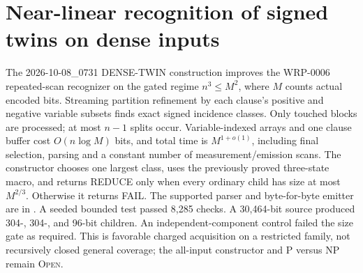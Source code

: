 \section{Near-linear recognition of signed twins on dense inputs}
The 2026-10-08\_0731 DENSE-TWIN construction improves the WRP-0006
repeated-scan recognizer on the gated regime $n^3\le M^2$, where $M$
counts actual encoded bits. Streaming partition refinement by each
clause's positive and negative variable subsets finds exact signed
incidence classes. Only touched blocks are processed; at most $n-1$
splits occur. Variable-indexed arrays and one clause buffer cost
$O(n\log M)$ bits, and total time is $M^{1+o(1)}$, including final
selection, parsing and a constant number of measurement/emission scans.
The constructor chooses one largest class, uses the previously proved
three-state macro, and returns REDUCE only when every ordinary child
has size at most $M^{2/3}$. Otherwise it returns FAIL.
The supported parser and byte-for-byte emitter are in
.
A seeded bounded test passed 8,285 checks. A 30,464-bit source produced
304-, 304-, and 96-bit children. An independent-component control failed
the size gate as required. This is favorable charged acquisition on a
restricted family, not recursively closed general coverage; the
all-input constructor and P versus NP remain \textsc{Open}.

